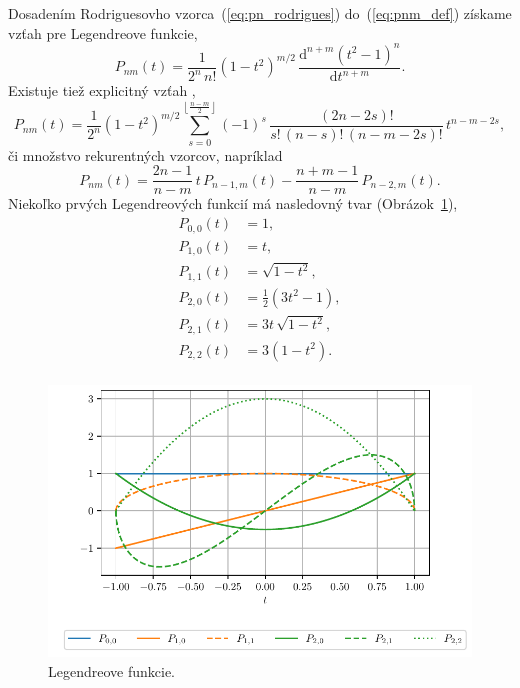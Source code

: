 \documentclass[a4paper, 12pt]{book}
\newcommand{\diff}{\mathrm d}
\begin{document}
Dosadením Rodriguesovho vzorca~(\ref{eq:pn_rodrigues}) do~(\ref{eq:pnm_def})
získame vzťah pre Legendreove funkcie,
%
\begin{equation}
\label{eq:pnm_ferrer}
P_{nm}(t) = \frac{1}{2^n \, n!} (1 - t^2)^{ m \slash 2} \, \frac{\diff^{n + m}
(t^2 - 1)^n}{\diff t^{n + m}}{.}
\end{equation}
%
Existuje tiež explicitný vzťah \parencite{Freeden2009},
%
\begin{equation}
P_{nm}(t) = \frac{1}{2^n}(1 - t^2)^{m \slash 2} \sum_{s = 0}^{\left\lfloor
\frac{n - m}{2} \right\rfloor} (-1)^s \, \frac{(2n - 2s)!}{s! \, (n - s)! \, (n
- m - 2s)!} \, t^{n - m - 2s}{,}
\end{equation}
%
či
%
množstvo rekurentných vzorcov, napríklad \parencite{Freeden2009}
%
\begin{equation}
\label{eq:pnm_recurrence}
P_{nm}(t) = \frac{2n - 1}{n - m} \, t \, P_{n - 1, m}(t) - \frac{n + m - 1}{n
- m} \, P_{n - 2, m}(t){.}
\end{equation}
%
Niekoľko prvých Legendreových funkcií má nasledovný tvar
(Obrázok~\ref{fig:lf}),
%
\begin{equation}
\label{eq:lf00_to_lf22}
\begin{split}
P_{0,0}(t) & = 1{,}\\
P_{1,0}(t) & = t{,}\\
P_{1,1}(t) & = \sqrt{1 - t^2}{,}\\
P_{2,0}(t) & = \frac{1}{2}(3t^2 - 1){,}\\
P_{2,1}(t) & = 3t \, \sqrt{1 - t^2}{,}\\
P_{2,2}(t) & = 3(1 - t^2){.}\\
\end{split}
\end{equation}

\begin{figure}[bt]
\centering
\includegraphics{./fig-legendre-functions.pdf}
\caption{Legendreove funkcie.}
\label{fig:lf}
\end{figure}
\end{document}
